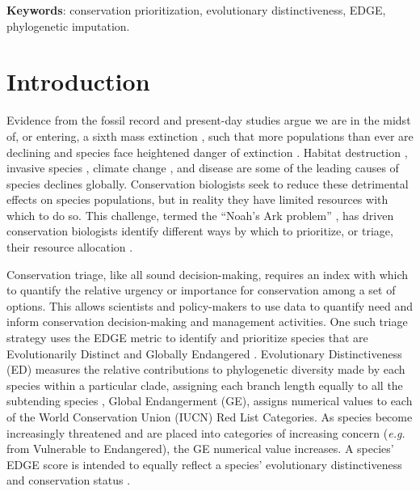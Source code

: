 \documentclass[10pt,english]{article}
\begin{document}
\textbf{Keywords}: conservation prioritization, evolutionary distinctiveness, 
EDGE, phylogenetic imputation.

\clearpage
\section*{Introduction}

Evidence from the fossil record and present-day studies argue we are in the
midst of, or entering, a sixth mass extinction \autocite{Barnosky2011,
Ceballos2015}, such that more populations than ever are declining and species
face heightened danger of extinction \autocite{Wake2008, Thomas2004}. Habitat
destruction \autocite{Brooks2002}, invasive species \autocite{Molnar2008},
climate change \autocite{Pounds2006}, and disease \autocite{Lips2006} are some
of the leading causes of species declines globally. Conservation biologists seek
to reduce these detrimental effects on species populations, but in reality they
have limited resources with which to do so. This challenge, termed the “Noah's
Ark problem” \autocite{Weitzman1998}, has driven conservation biologists
identify different ways by which to prioritize, or triage, their resource
allocation \autocite{Bottrill2008}.

Conservation triage, like all sound decision-making, requires an index  with
which to quantify the relative urgency or importance for conservation among a
set of options. This allows scientists and policy-makers to use data to quantify
need and inform conservation decision-making and management activities. One such
triage strategy uses the EDGE metric to identify and prioritize species that are
Evolutionarily Distinct and Globally Endangered \autocite{Isaac2007}.
Evolutionary Distinctiveness (ED) measures the relative contributions to
phylogenetic diversity made by each species within a particular clade, assigning
each branch length equally to all the subtending species \autocite{Isaac2007},
Global Endangerment (GE), assigns numerical values to each of the World
Conservation Union (IUCN) Red List Categories. As species become increasingly
threatened and are placed into categories of increasing concern (\emph{e.g.}
from Vulnerable to Endangered), the GE numerical value increases. A species' EDGE
score is intended to equally reflect a species' evolutionary distinctiveness and
conservation status \autocite[even if it does not always in practice; see][]{Pearse2015}.
\end{document}
